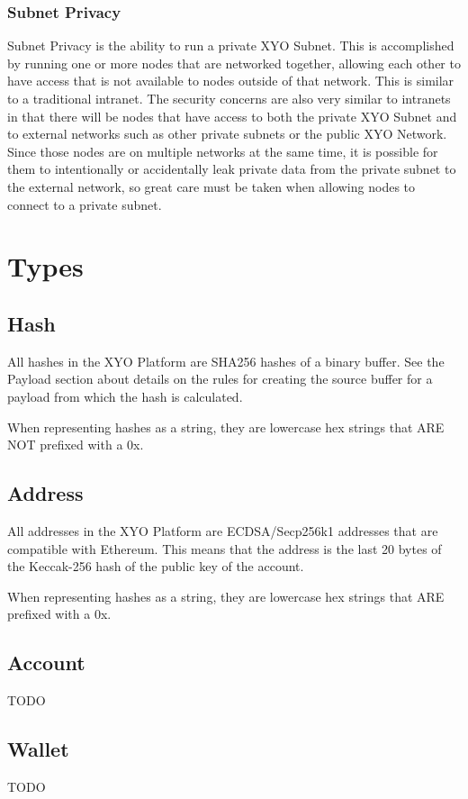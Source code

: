 \documentclass{article}
\begin{document}
\subsubsection{Subnet Privacy}
Subnet Privacy is the ability to run a private XYO Subnet.  This is accomplished by running one or more nodes that are networked together, allowing each other to have access that is not available to nodes outside of that network.  This is similar to a traditional intranet.  The security concerns are also very similar to intranets in that there will be nodes that have access to both the private XYO Subnet and to external networks such as other private subnets or the public XYO Network.  Since those nodes are on multiple networks at the same time, it is possible for them to intentionally or accidentally leak private data from the private subnet to the external network, so great care must be taken when allowing nodes to connect to a private subnet.

\clearpage
\section{Types}
\subsection{Hash}
All hashes in the XYO Platform are SHA256 hashes of a binary buffer.  See the Payload section about details on the rules for creating the source buffer for a payload from which the hash is calculated. 

When representing hashes as a string, they are lowercase hex strings that ARE NOT prefixed with a 0x.

\subsection{Address}
All addresses in the XYO Platform are ECDSA/Secp256k1 addresses that are compatible with Ethereum.  This means that the address is the last 20 bytes of the Keccak-256 hash of the public key of the account.

When representing hashes as a string, they are lowercase hex strings that ARE prefixed with a 0x.

\subsection{Account}
TODO
\subsection{Wallet}
TODO
\end{document}
